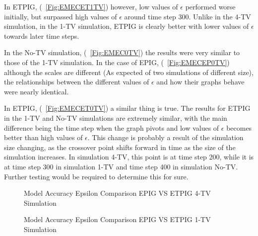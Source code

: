 \documentclass[letterpaper]{article} %
\begin{document}
In ETPIG, (\figurename~\ref{Fig:EMECET1TV}) however, low values of $\epsilon$ performed worse initially, but surpassed high values of $\epsilon$ around time step 300. Unlike in the 4-TV simulation, in the 1-TV simulation, ETPIG is clearly better with lower values of $\epsilon$ towards later time steps.

In the No-TV simulation, (\figurename~\ref{Fig:EMEC0TV}) the results were very similar to those of the 1-TV simulation. In the case of EPIG, (\figurename~\ref{Fig:EMECEP0TV}) although the scales are different (As expected of two simulations of different size), the relationships between the different values of $\epsilon$ and how their graphs behave were nearly identical.

In ETPIG, (\figurename~\ref{Fig:EMECET0TV}) a similar thing is true. The results for ETPIG in the 1-TV and No-TV simulations are extremely similar, with the main difference being the time step when the graph pivots and low values of $\epsilon$ becomes better than high values of $\epsilon$. This change is probably a result of the simulation size changing, as the crossover point shifts forward in time as the size of the simulation increases. In simulation 4-TV, this point is at time step 200, while it is at time step 300 in simulation 1-TV and time step 400 in simulation No-TV. Further testing would be required to determine this for sure.
\begin{figure}
	\begin{center}
		\hfill
		\hfill
	\end{center}
	\caption{Model Accuracy Epsilon Comparison EPIG VS ETPIG 4-TV Simulation}
	\label{Fig:EAEC4TV}
\end{figure}

\begin{figure}
	\begin{center}
		\hfill
		\hfill
	\end{center}
	\caption{Model Accuracy Epsilon Comparison EPIG VS ETPIG 1-TV Simulation}
	\label{Fig:EAEC1TV}
\end{figure}
\end{document}
